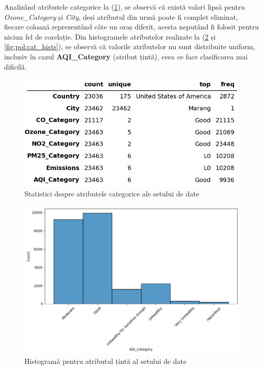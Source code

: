 \documentclass{article}
\begin{document}
Analizând atributele categorice la (\ref{fig:pol:cat_attr}), se observă că 
există valori lipsă pentru \textit{Ozone\_Category} și \textit{City}, deși
atributul din urmă poate fi complet eliminat, fiecare coloană reprezentând câte
un oraș diferit, acesta neputând fi folosit pentru niciun fel de corelație. Din
histogramele atributelor realizate la (\ref{fig:pol:cat_target} și
\ref{fig:pol:cat_hists}), se observă că valorile atributelor nu sunt distribuite
uniform, inclusiv în cazul \textbf{AQI\_Category} (atribut țintă), ceea ce face
clasificarea mai dificilă.

\begin{figure}[htb]
    \centering
    \includegraphics[scale=0.7]{air_pollution/analysis/categorical/table.png}
    \caption{Statistici despre atributele categorice ale setului de date}
    \label{fig:pol:cat_attr}
\end{figure}

\begin{figure}[htb]
    \centering
    \includegraphics[scale=0.33]{air_pollution/analysis/categorical/target.png}
    \caption{Histogramă pentru atributul țintă al setului de date}
    \label{fig:pol:cat_target}
\end{figure}
\end{document}
